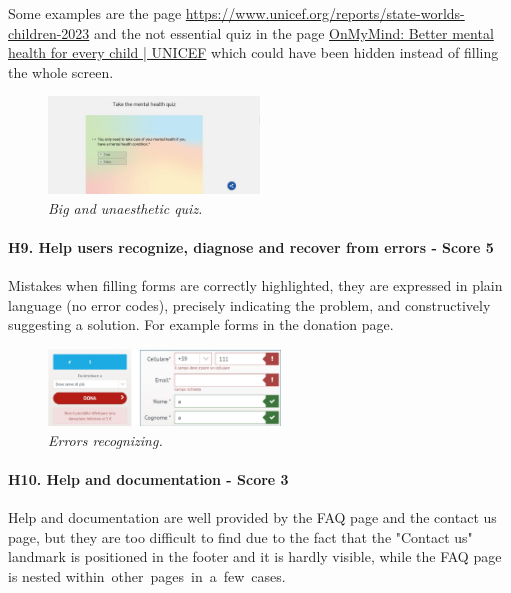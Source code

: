 \newline Some examples are the page \href{https://www.unicef.org/reports/state-worlds-children-2023}{https://www.unicef.org/reports/state-worlds-children-2023} and the not essential quiz in the page \href{https://www.unicef.org/on-my-mind}{OnMyMind: Better mental health for every child | UNICEF} which could have been hidden instead of filling the whole screen. 
\begin{figure}[!h]
	\begin{center}
		\includegraphics[width=0.5\textwidth]{FinalScores14.jpg}
		\captionsetup{font=small}
		\caption{\textit{Big and unaesthetic quiz.}}
	\end{center}
\end{figure}
\newline
\newline \paragraph{H9. Help users recognize, diagnose and recover from errors - Score 5} \label{subsec:H9}	Mistakes when filling forms are correctly highlighted, they are expressed in plain language (no error codes), precisely indicating the problem, and constructively suggesting a solution. For example forms in the donation page.
\begin{figure}[!h]
	\begin{center}
		\includegraphics[width=0.55\textwidth]{FinalScores15.jpg}
		\captionsetup{font=small}
		\caption{\textit{Errors recognizing.}}
	\end{center}
\end{figure}
\newline
\newline \paragraph{H10. Help and documentation - Score 3}  \label{subsec:H10}	Help and documentation are well provided by the FAQ page and the contact us page, but they are too difficult to find due to the fact that the "Contact us" landmark is positioned in the footer and it is hardly visible, while the FAQ page is nested within other pages in a few cases.
